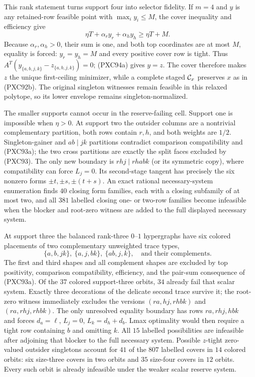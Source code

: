 \documentclass[11pt]{article}
\begin{document}
This rank statement turns support four into selector fidelity.  If
$m=4$ and $y$ is any retained-row feasible point with
$\max_i y_i\le M$, the cover inequality and efficiency give
\[
 \eta T+\alpha_r y_r+\alpha_hy_h\ge\eta T+M.
\]
Because $\alpha_r,\alpha_h>0$, their sum is one, and both top coordinates are
at most $M$, equality is forced: $y_r=y_h=M$ and every positive cover row is
tight.  Thus $A^T(y_{\{a,b,j,k\}}-z_{\{a,b,j,k\}})=0$; (PXC94a) gives $y=z$.
The cover therefore makes $z$ the unique first-ceiling minimizer, while a
complete staged ${\cal C}_x$ preserves $x$ as in (PXC92b).  The original
singleton witnesses remain feasible in this relaxed polytope, so its lower
envelope remains singleton-normalized.

The smaller supports cannot occur in the reserve-failing cell.  Support one
is impossible when $\eta>0$.  At support two the outsider columns are a
nontrivial complementary partition, both rows contain $r,h$, and both weights
are $1/2$.  Singleton-gainer and $ab\mid jk$ partitions contradict comparison
compatibility and (PXC93a); the two cross partitions are exactly the split
faces excluded by (PXC93).  The only new boundary is
$rhj\mid rhabk$ (or its symmetric copy), where compatibility can force
$L_j=0$.  Its second-stage tangent has precisely the six nonzero forms
$\pm t,\pm s,\pm(t+s)$.  An exact rational necessary-system enumeration finds
$40$ closing form families, each with a closing subfamily of at most two,
and all $381$ labelled closing one- or two-row families become infeasible
when the blocker and root-zero witness are added to the full displayed
necessary system.

At support three the balanced rank-three $0$--$1$ hypergraphs have six
colored placements of two complementary unweighted trace types,
\[
 \{a,b,jk\},\ \{a,j,bk\},\ \{ab,j,k\},
 \quad\text{and their complements}.                 \tag{PXC94b}
\]
The first and third shapes and all complement shapes are excluded by top
positivity, comparison compatibility, efficiency, and the pair-sum consequence
of (PXC93a).  Of the $37$ colored support-three orbits, $34$ already fail
that scalar system.  Exactly three decorations of the delicate second trace
survive it; the root-zero witness immediately excludes the versions
$(ra,hj,rhbk)$ and $(ra,rhj,rhbk)$.  The only unresolved equality boundary
has rows $ra,rhj,hbk$ and forces
$d_a=\ell$, $L_j=0$, $L_k=d_h+d_b$.  Lmax optimality would then require a
tight row containing $b$ and omitting $k$.  All $15$ labelled possibilities
are infeasible after adjoining that blocker to the full necessary system.
Possible $z$-tight zero-valued outsider singletons account for $41$ of the
$807$ labelled covers in $14$ colored orbits: six size-three covers in two
orbits and $35$ size-four covers in $12$ orbits.  Every such orbit is already
infeasible under the weaker scalar reserve system.
\end{document}
